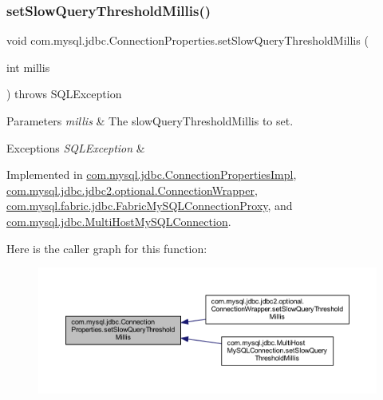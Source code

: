 \subsubsection{\texorpdfstring{set\+Slow\+Query\+Threshold\+Millis()}{setSlowQueryThresholdMillis()}}
{\footnotesize\ttfamily void com.\+mysql.\+jdbc.\+Connection\+Properties.\+set\+Slow\+Query\+Threshold\+Millis (\begin{DoxyParamCaption}\item[{int}]{millis }\end{DoxyParamCaption}) throws S\+Q\+L\+Exception}


\begin{DoxyParams}{Parameters}
{\em millis} & The slow\+Query\+Threshold\+Millis to set. \\
\hline
\end{DoxyParams}

\begin{DoxyExceptions}{Exceptions}
{\em S\+Q\+L\+Exception} & \\
\hline
\end{DoxyExceptions}


Implemented in \mbox{\hyperlink{classcom_1_1mysql_1_1jdbc_1_1_connection_properties_impl_a32694f0aad4b653be6c209d729576e60}{com.\+mysql.\+jdbc.\+Connection\+Properties\+Impl}}, \mbox{\hyperlink{classcom_1_1mysql_1_1jdbc_1_1jdbc2_1_1optional_1_1_connection_wrapper_ac0a113a1ba7f79345af3609e978a93fe}{com.\+mysql.\+jdbc.\+jdbc2.\+optional.\+Connection\+Wrapper}}, \mbox{\hyperlink{classcom_1_1mysql_1_1fabric_1_1jdbc_1_1_fabric_my_s_q_l_connection_proxy_a43c6bfeee4fadd1086af9e956ef658cf}{com.\+mysql.\+fabric.\+jdbc.\+Fabric\+My\+S\+Q\+L\+Connection\+Proxy}}, and \mbox{\hyperlink{classcom_1_1mysql_1_1jdbc_1_1_multi_host_my_s_q_l_connection_a0b2593b4f94be127319ff6d487f5edcc}{com.\+mysql.\+jdbc.\+Multi\+Host\+My\+S\+Q\+L\+Connection}}.

Here is the caller graph for this function\+:\nopagebreak
\begin{figure}[H]
\begin{center}
\leavevmode
\includegraphics[width=350pt]{interfacecom_1_1mysql_1_1jdbc_1_1_connection_properties_a3cfee5c659ab60c5fdb925490d81ad0f_icgraph}
\end{center}
\end{figure}
\mbox{\label{interfacecom_1_1mysql_1_1jdbc_1_1_connection_properties_ab0f719c12e2d1fe7fe6dd180e8c7a825}} 

